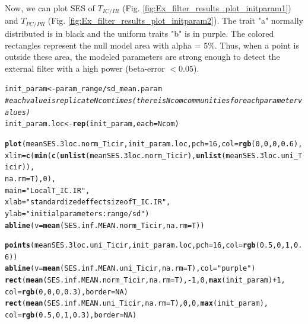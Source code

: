 \documentclass[12pt]{article}\usepackage[]{graphicx}\usepackage[]{color}
\makeatletter
\newcommand{\hlnum}[1]{\textcolor[rgb]{0.686,0.059,0.569}{#1}}%
\newcommand{\hlstr}[1]{\textcolor[rgb]{0.192,0.494,0.8}{#1}}%
\newcommand{\hlcom}[1]{\textcolor[rgb]{0.678,0.584,0.686}{\textit{#1}}}%
\newcommand{\hlopt}[1]{\textcolor[rgb]{0,0,0}{#1}}%
\newcommand{\hlstd}[1]{\textcolor[rgb]{0.345,0.345,0.345}{#1}}%
\newcommand{\hlkwb}[1]{\textcolor[rgb]{0.69,0.353,0.396}{#1}}%
\newcommand{\hlkwc}[1]{\textcolor[rgb]{0.333,0.667,0.333}{#1}}%
\newcommand{\hlkwd}[1]{\textcolor[rgb]{0.737,0.353,0.396}{\textbf{#1}}}%
\newenvironment{kframe}{%
 \def\at@end@of@kframe{}%
 \ifinner\ifhmode%
  \def\at@end@of@kframe{\end{minipage}}%
  \begin{minipage}{\columnwidth}%
 \fi\fi%
 \def\FrameCommand##1{\hskip\@totalleftmargin \hskip-\fboxsep
 \colorbox{shadecolor}{##1}\hskip-\fboxsep
     \hskip-\linewidth \hskip-\@totalleftmargin \hskip\columnwidth}%
 \MakeFramed {\advance\hsize-\width
   \@totalleftmargin\z@ \linewidth\hsize
   \@setminipage}}%
 {\par\unskip\endMakeFramed%
 \at@end@of@kframe}
\newenvironment{knitrout}{}{} %
\makeatother
\begin{document}
Now, we can plot SES of $T_{IC/IR}$ (Fig. \ref{fig:Ex_filter_results_plot_initparam1}) and $T_{PC/PR}$ (Fig. \ref{fig:Ex_filter_results_plot_initparam2}). The trait "a" normally distributed is in black and the uniform traits "b" is in purple. The colored rectangles represent the null model area with alpha = 5\%. Thus, when a point is outside these area, the modeled parameters are strong enough to detect the external filter with a high power (beta-error $ < 0.05$).

\begin{knitrout}\small
{}\color{fgcolor}\begin{kframe}
\begin{alltt}
\hlstd{init_param} \hlkwb{<-} \hlstd{param_range} \hlopt{/} \hlstd{sd_mean.param}
\hlcom{#each value is replicate Ncom times (there is Ncom communities for each parameter values)}
\hlstd{init_param.loc} \hlkwb{<-} \hlkwd{rep}\hlstd{(init_param,} \hlkwc{each} \hlstd{= Ncom)}

\hlkwd{plot}\hlstd{(meanSES.3loc.norm_Ticir, init_param.loc,} \hlkwc{pch} \hlstd{=} \hlnum{16}\hlstd{,} \hlkwc{col} \hlstd{=} \hlkwd{rgb}\hlstd{(}\hlnum{0}\hlstd{,} \hlnum{0}\hlstd{,} \hlnum{0}\hlstd{,} \hlnum{0.6}\hlstd{),}
     \hlkwc{xlim} \hlstd{=} \hlkwd{c}\hlstd{(}\hlkwd{min}\hlstd{(}\hlkwd{c}\hlstd{(}\hlkwd{unlist}\hlstd{(meanSES.3loc.norm_Ticir),} \hlkwd{unlist}\hlstd{(meanSES.3loc.uni_Ticir)),}
     \hlkwc{na.rm} \hlstd{= T),} \hlnum{0}\hlstd{),}
     \hlkwc{main} \hlstd{=} \hlstr{"Local T_IC.IR"}\hlstd{,}
     \hlkwc{xlab} \hlstd{=} \hlstr{"standardized effect size of T_IC.IR"}\hlstd{,}
     \hlkwc{ylab} \hlstd{=} \hlstr{"initial parameters: range/sd"}\hlstd{)}
\hlkwd{abline}\hlstd{(}\hlkwc{v} \hlstd{=} \hlkwd{mean}\hlstd{(SES.inf.MEAN.norm_Ticir,} \hlkwc{na.rm} \hlstd{= T))}

\hlkwd{points}\hlstd{(meanSES.3loc.uni_Ticir, init_param.loc,} \hlkwc{pch} \hlstd{=} \hlnum{16}\hlstd{,} \hlkwc{col} \hlstd{=} \hlkwd{rgb}\hlstd{(}\hlnum{0.5}\hlstd{,} \hlnum{0}\hlstd{,} \hlnum{1}\hlstd{,} \hlnum{0.6}\hlstd{))}
\hlkwd{abline}\hlstd{(}\hlkwc{v} \hlstd{=} \hlkwd{mean}\hlstd{(SES.inf.MEAN.uni_Ticir,} \hlkwc{na.rm} \hlstd{= T),} \hlkwc{col} \hlstd{=} \hlstr{"purple"}\hlstd{)}
\hlkwd{rect}\hlstd{(}\hlkwd{mean}\hlstd{(SES.inf.MEAN.norm_Ticir,} \hlkwc{na.rm} \hlstd{= T),} \hlopt{-}\hlnum{1}\hlstd{,} \hlnum{0}\hlstd{,} \hlkwd{max}\hlstd{(init_param)} \hlopt{+} \hlnum{1}\hlstd{,}
     \hlkwc{col} \hlstd{=} \hlkwd{rgb}\hlstd{(}\hlnum{0}\hlstd{,} \hlnum{0}\hlstd{,} \hlnum{0}\hlstd{,} \hlnum{0.3}\hlstd{),} \hlkwc{border} \hlstd{=} \hlnum{NA}\hlstd{)}
\hlkwd{rect}\hlstd{(}\hlkwd{mean}\hlstd{(SES.inf.MEAN.uni_Ticir,} \hlkwc{na.rm} \hlstd{= T),}\hlnum{0}\hlstd{,} \hlnum{0}\hlstd{,} \hlkwd{max}\hlstd{(init_param),}
     \hlkwc{col} \hlstd{=} \hlkwd{rgb}\hlstd{(}\hlnum{0.5}\hlstd{,} \hlnum{0}\hlstd{,} \hlnum{1}\hlstd{,} \hlnum{0.3}\hlstd{),} \hlkwc{border} \hlstd{=} \hlnum{NA}\hlstd{)}
\end{alltt}
\end{kframe}\begin{figure}


\end{figure}
\end{knitrout}
\end{document}
